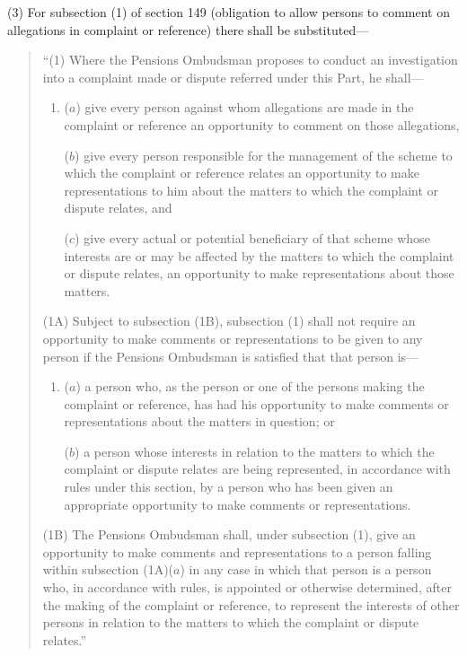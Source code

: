 \documentclass[12pt,a4paper]{article}
\begin{document}
(3) For subsection (1)  of section 149 (obligation to allow persons to comment on allegations in complaint or reference) there shall be substituted—
\begin{quotation}
“(1) Where the Pensions Ombudsman proposes to conduct an investigation into a complaint made or dispute referred under this Part, he shall—
\begin{enumerate}\item[]
($a$) give every person against whom allegations are made in the complaint or reference an opportunity to comment on those allegations,

($b$) give every person responsible for the management of the scheme to which the complaint or reference relates an opportunity to make representations to him about the matters to which the complaint or dispute relates, and

($c$) give every actual or potential beneficiary of that scheme whose interests are or may be affected by the matters to which the complaint or dispute relates, an opportunity to make representations about those matters.
\end{enumerate}

(1A) Subject to subsection (1B), subsection (1)  shall not require an opportunity to make comments or representations to be given to any person if the Pensions Ombudsman is satisfied that that person is—
\begin{enumerate}\item[]
($a$) a person who, as the person or one of the persons making the complaint or reference, has had his opportunity to make comments or representations about the matters in question; or

($b$) a person whose interests in relation to the matters to which the complaint or dispute relates are being represented, in accordance with rules under this section, by a person who has been given an appropriate opportunity to make comments or representations.
\end{enumerate}

(1B) The Pensions Ombudsman shall, under subsection (1), give an opportunity to make comments and representations to a person falling within subsection (1A)($a$)  in any case in which that person is a person who, in accordance with rules, is appointed or otherwise determined, after the making of the complaint or reference, to represent the interests of other persons in relation to the matters to which the complaint or dispute relates.”
\end{quotation}
\end{document}
